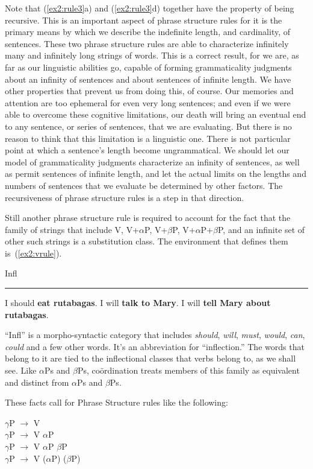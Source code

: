 Note that (\ref{ex2:rule3}a) and (\ref{ex2:rule3}d) together have the property of being recursive. This is an important aspect of phrase structure rules for it is the primary means by which we describe the indefinite length, and cardinality, of sentences. These two phrase structure rules are able to characterize infinitely many and infinitely long strings of words. This is a correct result, for we are, as far as our linguistic abilities go, capable of forming grammaticality judgments about an infinity of sentences and about sentences of infinite length. We have other properties that prevent us from doing this, of course. Our memories and attention are too ephemeral for even very long sentences; and even if we were able to overcome these cognitive limitations, our death will bring an eventual end to any sentence, or series of sentences, that we are evaluating. But there is no reason to think that this limitation is a linguistic one. There is not particular point at which a sentence's length become ungrammatical. We should let our model of grammaticality judgments characterize an infinity of sentences, as well as permit sentences of infinite length, and let the actual limits on the lengths and numbers of sentences that we evaluate be determined by other factors. The recursiveness of phrase structure rules is a step in that direction.

Still another phrase structure rule is required to account for the fact that the family of strings that include V, V+$\alpha$P, V+$\beta$P, V+$\alpha$P+$\beta$P, and an infinite set of other such strings is a substitution class. The environment that defines them is~(\ref{ex2:vrule}).
\pagebreak
\begin{exe}
\ex \label{ex2:vrule} Infl \rule{5mm}{.1mm}
\begin{xlist}
	\ex I should \textbf{eat rutabagas}.
	\ex I will \textbf{talk to Mary}.
	\ex I will \textbf{tell Mary about rutabagas}.
\end{xlist}
\end{exe}
``Infl'' is a morpho-syntactic category that includes \emph{should}, \emph{will}, \emph{must}, \emph{would}, \emph{can}, \emph{could} and a few other words. It's an abbreviation for ``inflection.'' The words that belong to it are tied to the inflectional classes that verbs belong to, as we shall see.  Like $\alpha$Ps and $\beta$Ps, co\"ordination treats members of this family as equivalent and distinct from $\alpha$Ps and $\beta$Ps.
\begin{exe}
	\ex \label{ex2:phrase5} 
	\begin{xlist}
	\end{xlist}
\end{exe}
These facts call for Phrase Structure rules like the following:
\begin{exe}
	\ex \label{ex2:rule4} $\gamma$P $\rightarrow$ V\\
	$\gamma$P $\rightarrow$ V $\alpha$P\\ 
	$\gamma$P $\rightarrow$ V $\alpha$P $\beta$P\\
	$\gamma$P $\rightarrow$	V ($\alpha$P) ($\beta$P)
\end{exe}


